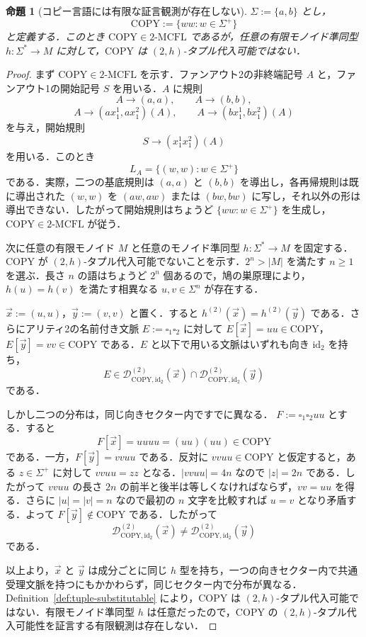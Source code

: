 \documentclass[11pt,a4paper]{ltjsarticle}
\numberwithin{equation}{section}
\theoremstyle{plain}
\newtheorem{proposition}[theorem]{命題}
\theoremstyle{definition}
\theoremstyle{remark}
\newcommand{\D}{\mathcal{D}}
\newcommand{\tuple}[1]{\vec{#1}}
\newcommand{\blank}{\square}
\begin{document}
\begin{proposition}[コピー言語には有限な証言観測が存在しない]
\label{prop:copy-infinite-observation}
$\Sigma:=\{a,b\}$ とし，
\[
\mathrm{COPY}:=\{ww:w\in\Sigma^+\}
\]
と定義する．このとき $\mathrm{COPY}\in2\text{-}\mathrm{MCFL}$ であるが，任意の有限モノイド準同型 $h:\Sigma^*\to M$ に対して，$\mathrm{COPY}$ は $(2,h)$-タプル代入可能ではない．
\end{proposition}

\begin{proof}
まず $\mathrm{COPY}\in2\text{-}\mathrm{MCFL}$ を示す．ファンアウト2の非終端記号 $A$ と，ファンアウト1の開始記号 $S$ を用いる．$A$ に規則
\[
A\to(a,a),\qquad A\to(b,b),
\]
\[
A\to(a x_1^1,a x_1^2)(A),\qquad
A\to(b x_1^1,b x_1^2)(A)
\]
を与え，開始規則
\[
S\to(x_1^1x_1^2)(A)
\]
を用いる．このとき
\[
L_A=\{(w,w):w\in\Sigma^+\}
\]
である．実際，二つの基底規則は $(a,a)$ と $(b,b)$ を導出し，各再帰規則は既に導出された $(w,w)$ を $(aw,aw)$ または $(bw,bw)$ に写し，それ以外の形は導出できない．したがって開始規則はちょうど $\{ww:w\in\Sigma^+\}$ を生成し，$\mathrm{COPY}\in2\text{-}\mathrm{MCFL}$ が従う．

次に任意の有限モノイド $M$ と任意のモノイド準同型 $h\colon\Sigma^*\to M$ を固定する．$\mathrm{COPY}$ が $(2,h)$-タプル代入可能でないことを示す．$2^n>|M|$ を満たす $n\ge1$ を選ぶ．長さ $n$ の語はちょうど $2^n$ 個あるので，鳩の巣原理により，$h(u)=h(v)$ を満たす相異なる $u,v\in\Sigma^n$ が存在する．

$\tuple x:=(u,u)$，$\tuple y:=(v,v)$ と置く．すると
$h^{(2)}(\tuple x)=h^{(2)}(\tuple y)$ である．さらにアリティ2の名前付き文脈
$E:=\blank_1\blank_2$ に対して
$E[\tuple x]=uu\in\mathrm{COPY}$，$E[\tuple y]=vv\in\mathrm{COPY}$ である．$E$ と以下で用いる文脈はいずれも向き $\mathrm{id}_2$ を持ち，
\[
E\in\D_{\mathrm{COPY},\mathrm{id}_2}^{(2)}(\tuple x)\cap
\D_{\mathrm{COPY},\mathrm{id}_2}^{(2)}(\tuple y)
\]
である．

しかし二つの分布は，同じ向きセクター内ですでに異なる．
$F:=\blank_1\blank_2uu$ とする．すると
\[
F[\tuple x]=uuuu=(uu)(uu)\in\mathrm{COPY}
\]
である．一方，$F[\tuple y]=vvuu$ である．反対に $vvuu\in\mathrm{COPY}$ と仮定すると，ある $z\in\Sigma^+$ に対して $vvuu=zz$ となる．$|vvuu|=4n$ なので $|z|=2n$ である．したがって $vvuu$ の長さ $2n$ の前半と後半は等しくなければならず，$vv=uu$ を得る．さらに $|u|=|v|=n$ なので最初の $n$ 文字を比較すれば $u=v$ となり矛盾する．よって
$F[\tuple y]\notin\mathrm{COPY}$ である．したがって
\[
\D_{\mathrm{COPY},\mathrm{id}_2}^{(2)}(\tuple x)\neq
\D_{\mathrm{COPY},\mathrm{id}_2}^{(2)}(\tuple y)
\]
である．

以上より，$\tuple x$ と $\tuple y$ は成分ごとに同じ $h$ 型を持ち，一つの向きセクター内で共通受理文脈を持つにもかかわらず，同じセクター内で分布が異なる．Definition~\ref{def:tuple-substitutable} により，$\mathrm{COPY}$ は $(2,h)$-タプル代入可能ではない．有限モノイド準同型 $h$ は任意だったので，$\mathrm{COPY}$ の $(2,h)$-タプル代入可能性を証言する有限観測は存在しない．
\end{proof}
\end{document}
